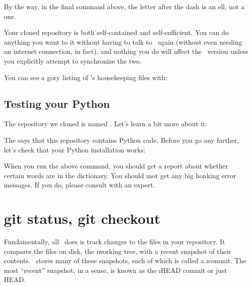 \documentclass[letterpaper, 12pt, titlepage, twoside]{article}
\begin{document}
By the way, in the final command above, the letter after the dash is an ell,
not a one.


Your cloned repository is both self-contained and self-sufficient. You can do
anything you want to it without having to talk to \github\ again (without even
needing an internet connection, in fact), and nothing you do will affect the
\github\ version unless you explicitly attempt to synchronize the two.

You can see a gory listing of \git's housekeeping files with:


\subsection*{Testing your Python}

The repository we cloned is named . Let's learn a bit more about
it:


The  says that this repository contains Python code. Before you go
any farther, let's check that your Python installation works:


When you run the above command, you should get a report about whether certain
words are in the dictionary. You should \i{not} get any big honking error
messages. If you do, please consult with an expert.


\section{git status, git checkout}


Fundamentally, \x all \git\ does is track changes to the files in your
repository. It compares the files on disk, the \i{working tree}, with a recent
snapshot of their contents. \git\ stores many of these snapshots, each of
which is called a \i{commit}. The most ``recent'' snapshot, in a sense, is
known as the \i{HEAD} commit or just HEAD.
\end{document}
